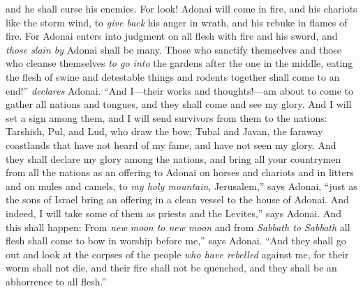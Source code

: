 \begin{biblechapter}
and he shall curse his enemies.
\verse For look! Adonai will come in fire, 
and his chariots like the storm wind, 
to \textit{give back} his anger in wrath, 
and his rebuke in flames of fire.
\verse For Adonai enters into judgment on all flesh with fire and his sword, 
and \textit{those slain by} Adonai shall be many.
\verse Those who sanctify themselves 
and those who cleanse themselves \textit{to go into} the gardens after the one in the middle, 
eating the flesh of swine 
and detestable things and rodents together shall come to an end!” \textit{declares} Adonai.
\verse “And I—their works and thoughts!—am about to come to gather all nations and tongues, 
and they shall come and see my glory.
\verse And I will set a sign among them, 
and I will send survivors from them to the nations: 
Tarshish, Pul, and Lud, who draw the bow; 
Tubal and Javan, the faraway coastlands 
that have not heard of my fame, 
and have not seen my glory.
\verse And they shall declare my glory among the nations,
\verse and bring all your countrymen from all the nations as an offering to Adonai on horses and chariots and in litters and on mules and camels, to \textit{my holy mountain}, Jerusalem,” says Adonai, “just as the sons of Israel bring an offering in a clean vessel to the house of Adonai.
\verse And indeed, I will take some of them as priests and the Levites,” says Adonai.
\verse And this shall happen: From \textit{new moon to new moon} and from \textit{Sabbath to Sabbath} all flesh shall come to bow in worship before me,” says Adonai.
\verse “And they shall go out and look at the corpses of the people \textit{who have rebelled} against me, for their worm shall not die, 
and their fire shall not be quenched, 
and they shall be an abhorrence to all flesh.”
\end{biblechapter}

